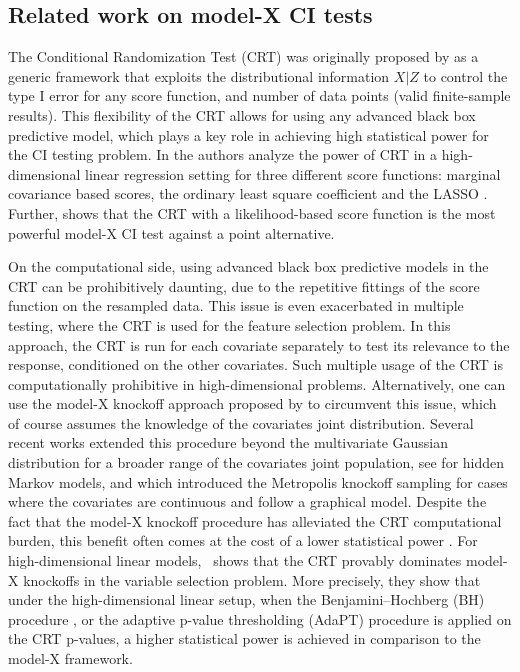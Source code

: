 \documentclass[11pt]{article}
\begin{document}
\subsection{ Related work on model-X CI tests}
The Conditional Randomization Test (CRT) was originally proposed by \cite{candes2018panning} as a generic framework that exploits the distributional information $X|Z$ to control the type I error for any score function, and number of data points (valid finite-sample results). This flexibility of the CRT allows for using any advanced black box predictive model, which plays a key role in achieving high statistical power for the CI testing problem. In \cite{wang2020power} the authors analyze the power of CRT in a high-dimensional linear regression setting for three different score functions: marginal covariance based scores,  the ordinary least square coefficient and the LASSO \cite{tibshirani1996regression}. Further, \cite{katsevich2020theoretical} shows that the CRT with a likelihood-based score function is the most powerful model-X CI test against a point alternative. 

On the computational side, using  advanced black box predictive models in the CRT can be prohibitively daunting, due to the repetitive fittings of the score function on the resampled data. This issue is even exacerbated in multiple testing, where the CRT is used for the feature selection problem. In this approach, the CRT is run for each covariate separately to test its relevance to the response, conditioned on the other covariates. Such multiple usage of the CRT is computationally prohibitive in high-dimensional problems. Alternatively, one can use the model-X knockoff approach  proposed  by \cite{candes2018panning} to circumvent this issue, which of course assumes the knowledge of the covariates  joint distribution. Several recent works extended this procedure beyond the multivariate Gaussian distribution for a broader range of the covariates joint population, see \cite{sesia2017gene} for hidden Markov models,  and \cite{bates2020metropolized} which introduced the Metropolis knockoff sampling for cases where
the covariates are continuous and follow a graphical model. Despite the fact that the model-X knockoff procedure has alleviated the CRT computational burden, this benefit often comes at the cost of a lower statistical power \cite[Section 5.3]{candes2018panning}.  For high-dimensional linear models,~\cite{wang2020power} shows that the CRT provably dominates model-X knockoffs in the variable selection problem. More precisely, they show that under the high-dimensional linear setup, when the Benjamini–Hochberg (BH) procedure \cite{benjamini1995controlling}, or the adaptive p-value thresholding (AdaPT) procedure \cite{lei2018adapt} is applied on the CRT p-values, a higher statistical power is achieved in comparison to the model-X framework.
\end{document}
